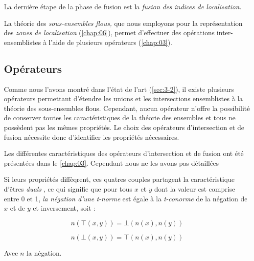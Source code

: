 La dernière étape de la phase de fusion est la \emph{fusion des
  indices de localisation.}


%
La théorie des \emph{sous-ensembles flous,} que nous employons pour la
représentation des \emph{zones de localisation} (\autoref{chap:06}),
permet d'effectuer des opérations inter-ensemblistes à l'aide de
plusieurs opérateurs (\autoref{chap:03}). 

\subsection{Opérateurs}

Comme nous l'avons montré dans l'état de l'art (\autoref{sec:3-2}), il
existe plusieurs opérateurs permettant d'étendre les unions et les
intersections ensemblistes à la théorie des sous-ensembles
flous. Cependant, aucun opérateur n'offre la possibilité de conserver
toutes les caractéristiques de la théorie des ensembles et tous
ne possèdent pas les mêmes propriétés. Le choix des opérateurs
d'intersection et de fusion nécessite donc d'identifier les
propriétés nécessaires.


Les différentes caractéristiques des opérateurs d'intersection et de
fusion ont été présentées dans le \autoref{chap:03}. Cependant nous ne
les avons pas détaillées 



Si leurs propriétés diffèqrent, ces quatres couples partagent la
caractéristique d'êtres \emph{duals} \autocite{Bouchon-Meunier2007},
ce qui signifie que pour tous \(x\) et \(y\) dont la valeur est
comprise entre 0 et 1, \emph{la négation d'une \emph{t-norme}} est
égale à la \emph{t-conorme} de la négation de \(x\) et de \(y\) et
inversement, soit :

\begin{equation}
  n(⊤(x,y)) = ⊥(n(x), n(y))
\end{equation}

\begin{equation}
  n(⊥(x,y)) = ⊤(n(x), n(y))
\end{equation}

Avec \(n\) la négation.




